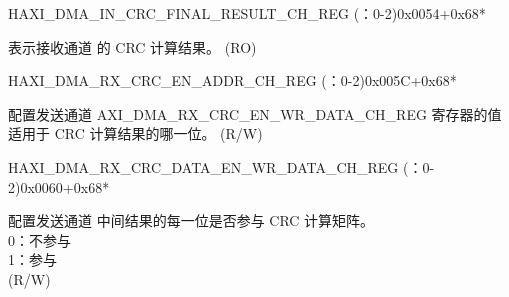 \begin{register}{H}{AXI\_DMA\_IN\_CRC\_FINAL\_RESULT\_CH\_REG (：0-2)}{0x0054+0x68*}\label{regdesc:AXIDMAINCRCFINALRESULTCHNREG}
%
\regnewline%
\begin{regdesc}\begin{reglist}
\label{fielddesc:AXIDMAINCRCFINALRESULTCHN}\item [AXI\_DMA\_IN\_CRC\_FINAL\_RESULT\_CH\regindex{n}] 表示接收通道  的 CRC 计算结果。 (RO)
\end{reglist}\end{regdesc}
\end{register}


\begin{register}{H}{AXI\_DMA\_RX\_CRC\_EN\_ADDR\_CH\_REG (：0-2)}{0x005C+0x68*}\label{regdesc:AXIDMARXCRCENADDRCHNREG}
%
\regnewline%
\begin{regdesc}\begin{reglist}
\label{fielddesc:AXIDMARXCRCENADDRCHN}\item [AXI\_DMA\_RX\_CRC\_EN\_ADDR\_CH\regindex{n}] 配置发送通道  AXI\_DMA\_RX\_CRC\_EN\_WR\_DATA\_CH\_REG 寄存器的值适用于 CRC 计算结果的哪一位。 (R/W)
\end{reglist}\end{regdesc}
\end{register}


\begin{register}{H}{AXI\_DMA\_RX\_CRC\_DATA\_EN\_WR\_DATA\_CH\_REG (：0-2)}{0x0060+0x68*}\label{regdesc:AXIDMARXCRCDATAENWRDATACHNREG}
%
%
\regnewline%
\begin{regdesc}\begin{reglist}
\label{fielddesc:AXIDMARXCRCDATAENWRDATACHN}\item [AXI\_DMA\_RX\_CRC\_DATA\_EN\_WR\_DATA\_CH\regindex{n}] 配置发送通道  中间结果的每一位是否参与 CRC 计算矩阵。\\
0：不参与\\
1：参与\\ (R/W)
\end{reglist}\end{regdesc}
\end{register}


